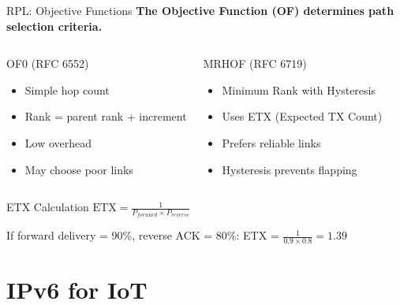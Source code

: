 \documentclass[aspectratio=169,11pt]{beamer}
\begin{document}
\begin{frame}{RPL: Objective Functions}
    \textbf{The Objective Function (OF) determines path selection criteria.}
    
    \vspace{0.3cm}
    \begin{columns}
        \begin{block}{OF0 (RFC 6552)}
            \begin{itemize}
                \item Simple hop count
                \item Rank = parent rank + increment
                \item Low overhead
                \item May choose poor links
            \end{itemize}
        \end{block}
        
        \begin{block}{MRHOF (RFC 6719)}
            \begin{itemize}
                \item Minimum Rank with Hysteresis
                \item Uses ETX (Expected TX Count)
                \item Prefers reliable links
                \item Hysteresis prevents flapping
            \end{itemize}
        \end{block}
    \end{columns}
    
    \vspace{0.3cm}
    \begin{exampleblock}{ETX Calculation}
        $\text{ETX} = \frac{1}{P_{forward} \times P_{reverse}}$
        
        \vspace{0.2cm}
        If forward delivery = 90\%, reverse ACK = 80\%: ETX = $\frac{1}{0.9 \times 0.8} = 1.39$
    \end{exampleblock}
\end{frame}

\section{IPv6 for IoT}
\end{document}
